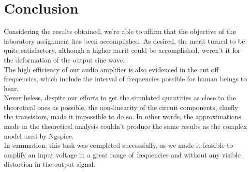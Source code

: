 \section{Conclusion}
\label{sec:conclusion}

Considering the results obtained, we're able to affirm that the objective of the laboratory assignment has been accomplished. As desired, the merit turned to be quite satisfactory, although a higher merit could be accomplished, weren't it for the deformation of the output sine wave.\\

The high efficiency of our audio amplifier is also evidenced in the cut off frequencies, which include the interval of frequencies possible for human beings to hear.\\

Nevertheless, despite our efforts to get the simulated quantities as close to the theoretical ones as possible, the non-linearity of the circuit components, chiefly the transistors, made it impossible to do so. In other words, the approximations made in the theoretical analysis couldn't produce the same results as the complex model used by Ngspice.\\

In summation, this task was completed successfully, as we made it feasible to amplify an input voltage in a great range of frequencies and without any visible distortion in the output signal.
